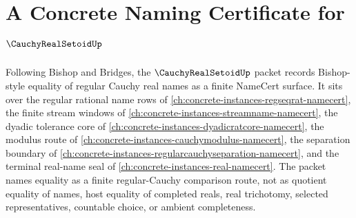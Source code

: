 \chapter{A Concrete Naming Certificate for $\CauchyRealSetoidUp$}
\label{ch:concrete-instances-cauchy-real-setoid-namecert}

Following Bishop and Bridges, the $\CauchyRealSetoidUp$ packet records Bishop-style equality of regular Cauchy real names as a finite NameCert surface. It sits over the regular rational name rows of \autoref{ch:concrete-instances-regseqrat-namecert}, the finite stream windows of \autoref{ch:concrete-instances-streamname-namecert}, the dyadic tolerance core of \autoref{ch:concrete-instances-dyadicratcore-namecert}, the modulus route of \autoref{ch:concrete-instances-cauchymodulus-namecert}, the separation boundary of \autoref{ch:concrete-instances-regularcauchyseparation-namecert}, and the terminal real-name seal of \autoref{ch:concrete-instances-real-namecert}. The packet names equality as a finite regular-Cauchy comparison route, not as quotient equality of names, host equality of completed reals, real trichotomy, selected representatives, countable choice, or ambient completeness.

